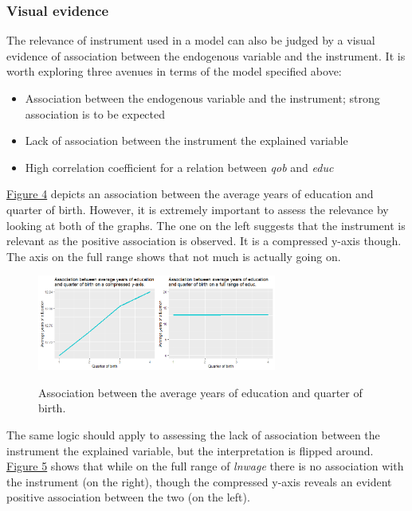 \documentclass{article}
\begin{document}
\subsubsection{Visual evidence}

The relevance of instrument used in a model can also be judged by a visual evidence of association between the endogenous variable and the instrument. It is worth exploring three avenues in terms of the model specified above:

\begin{itemize}
    \item Association between the endogenous variable and the instrument; strong association is to be expected
    \item Lack of association between the instrument the explained variable
    \item High correlation coefficient for a relation between \textit{qob} and \textit{educ}
\end{itemize}

\hyperref[fig:qobeduc]{Figure 4} depicts an association between the average years of education and quarter of birth. However, it is extremely important to assess the relevance by looking at both of the graphs. The one on the left suggests that the instrument is relevant as the positive association is observed. It is a compressed y-axis though. The axis on the full range shows that not much is actually going on.

\begin{figure}[!htbp]
    \caption{Association between the average years of education and quarter of birth.}
    \centering
    \includegraphics[width=0.7\textwidth]{scatterQobEduc.png}
    \label{fig:qobeduc}
\end{figure}

The same logic should apply to assessing the lack of association between the instrument the explained variable, but the interpretation is flipped around. \hyperref[fig:qobwage]{Figure 5} shows that while on the full range of \textit{lnwage} there is no association with the instrument (on the right), though the compressed y-axis reveals an evident positive association between the two (on the left). 
\end{document}
